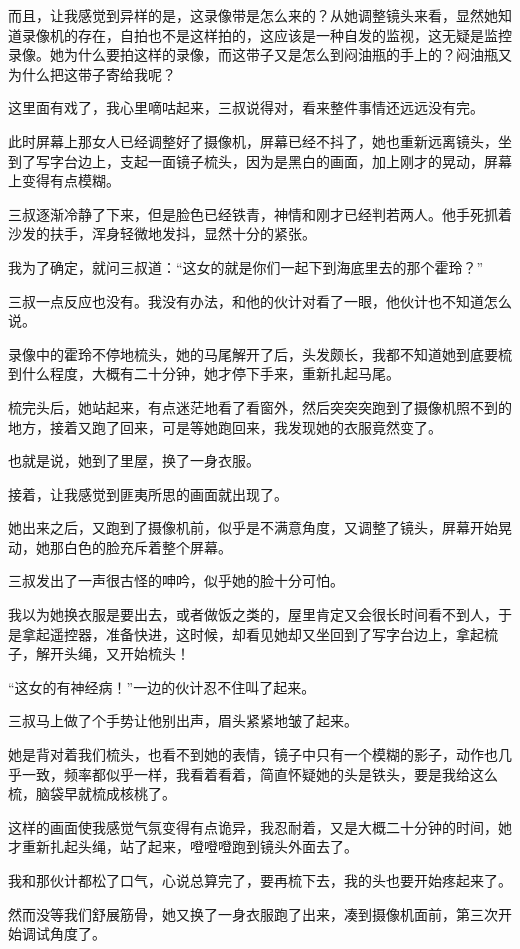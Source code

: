 而且，让我感觉到异样的是，这录像带是怎么来的？从她调整镜头来看，显然她知道录像机的存在，自拍也不是这样拍的，这应该是一种自发的监视，这无疑是监控录像。她为什么要拍这样的录像，而这带子又是怎么到闷油瓶的手上的？闷油瓶又为什么把这带子寄给我呢？

这里面有戏了，我心里嘀咕起来，三叔说得对，看来整件事情还远远没有完。

此时屏幕上那女人已经调整好了摄像机，屏幕已经不抖了，她也重新远离镜头，坐到了写字台边上，支起一面镜子梳头，因为是黑白的画面，加上刚才的晃动，屏幕上变得有点模糊。

三叔逐渐冷静了下来，但是脸色已经铁青，神情和刚才已经判若两人。他手死抓着沙发的扶手，浑身轻微地发抖，显然十分的紧张。

我为了确定，就问三叔道：“这女的就是你们一起下到海底里去的那个霍玲？”

三叔一点反应也没有。我没有办法，和他的伙计对看了一眼，他伙计也不知道怎么说。

录像中的霍玲不停地梳头，她的马尾解开了后，头发颇长，我都不知道她到底要梳到什么程度，大概有二十分钟，她才停下手来，重新扎起马尾。

梳完头后，她站起来，有点迷茫地看了看窗外，然后突突突跑到了摄像机照不到的地方，接着又跑了回来，可是等她跑回来，我发现她的衣服竟然变了。

也就是说，她到了里屋，换了一身衣服。

接着，让我感觉到匪夷所思的画面就出现了。

她出来之后，又跑到了摄像机前，似乎是不满意角度，又调整了镜头，屏幕开始晃动，她那白色的脸充斥着整个屏幕。

三叔发出了一声很古怪的呻吟，似乎她的脸十分可怕。

我以为她换衣服是要出去，或者做饭之类的，屋里肯定又会很长时间看不到人，于是拿起遥控器，准备快进，这时候，却看见她却又坐回到了写字台边上，拿起梳子，解开头绳，又开始梳头！

“这女的有神经病！”一边的伙计忍不住叫了起来。

三叔马上做了个手势让他别出声，眉头紧紧地皱了起来。

她是背对着我们梳头，也看不到她的表情，镜子中只有一个模糊的影子，动作也几乎一致，频率都似乎一样，我看着看着，简直怀疑她的头是铁头，要是我给这么梳，脑袋早就梳成核桃了。

这样的画面使我感觉气氛变得有点诡异，我忍耐着，又是大概二十分钟的时间，她才重新扎起头绳，站了起来，噔噔噔跑到镜头外面去了。

我和那伙计都松了口气，心说总算完了，要再梳下去，我的头也要开始疼起来了。

然而没等我们舒展筋骨，她又换了一身衣服跑了出来，凑到摄像机面前，第三次开始调试角度了。

